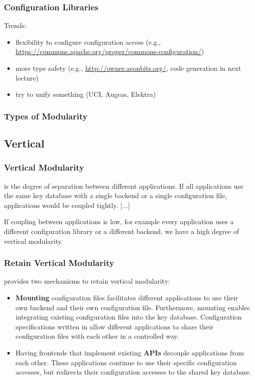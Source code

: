 \begin{frame}[fragile]
	\frametitle{Configuration Libraries}

	Trends:
	\begin{itemize}[<+-| alert@+>]
	\item flexibility to configure configuration access (e.g., \url{https://commons.apache.org/proper/commons-configuration/})
	\item more type safety (e.g., \url{http://owner.aeonbits.org/}, code generation in next lecture)
	\item try to unify something (UCI, Augeas, Elektra)
	\end{itemize}
\end{frame}

\begin{frame}
	\frametitle{Types of Modularity}
	\Large
\end{frame}

\subsection{Vertical}

\begin{frame}[fragile]
	\frametitle{Vertical Modularity \cite{raab2016improving}}

	 is the degree of separation between different applications.
	If all applications use the same key database with a single backend or a single configuration file, applications would be coupled tightly.
	[...]

	If coupling between applications is low, for example every application uses a different configuration library or a different backend, we have a high degree of vertical modularity.
\end{frame}


\begin{frame}
	\frametitle{Retain Vertical Modularity \cite{raab2016improving}}

	\elektra{} provides two mechanisms to retain vertical modularity:

	\begin{itemize}
	\item \textbf{Mounting} configuration files facilitates different applications to use their own backend and their own configuration file.
	Furthermore, mounting enables integrating existing configuration files into the key database.
	Configuration specifications written in  allow different applications to share their configuration files with each other in a controlled way.

	\item Having frontends that implement existing \textbf{APIs} decouple applications from each other.
	These applications continue to use their specific configuration accesses, but \elektra{} redirects their configuration accesses to the shared key database.
	\end{itemize}
\end{frame}

